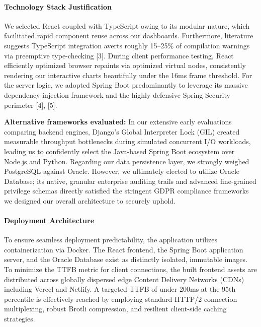 \paragraph*{Technology Stack
Justification}\label{technology-stack-justification}

We selected React coupled with TypeScript owing to its modular nature,
which facilitated rapid component reuse across our dashboards.
Furthermore, literature suggests TypeScript integration averts roughly
15--25\% of compilation warnings via preemptive type-checking {[}3{]}.
During client performance testing, React efficiently optimized browser
repaints via optimized virtual nodes, consistently rendering our
interactive charts beautifully under the 16ms frame threshold. For the
server logic, we adopted Spring Boot predominantly to leverage its
massive dependency injection framework and the highly defensive Spring
Security perimeter {[}4{]}, {[}5{]}.

\textbf{Alternative frameworks evaluated:} In our extensive early
evaluations comparing backend engines, Django's Global Interpreter Lock
(GIL) created measurable throughput bottlenecks during simulated
concurrent I/O workloads, leading us to confidently select the
Java-based Spring Boot ecosystem over Node.js and Python. Regarding our
data persistence layer, we strongly weighed PostgreSQL against Oracle.
However, we ultimately elected to utilize Oracle Database; its native,
granular enterprise auditing trails and advanced fine-grained privilege
schemas directly satisfied the stringent GDPR compliance frameworks we
designed our overall architecture to securely uphold.

\paragraph*{Deployment Architecture}\label{deployment-architecture}

To ensure seamless deployment predictability, the application utilizes
containerization via Docker. The React frontend, the Spring Boot
application server, and the Oracle Database exist as distinctly
isolated, immutable images. To minimize the TTFB metric for client
connections, the built frontend assets are distributed across globally
dispersed edge Content Delivery Networks (CDNs) including Vercel and
Netlify. A targeted TTFB of under 200ms at the 95th percentile is
effectively reached by employing standard HTTP/2 connection
multiplexing, robust Brotli compression, and resilient client-side
caching strategies.

